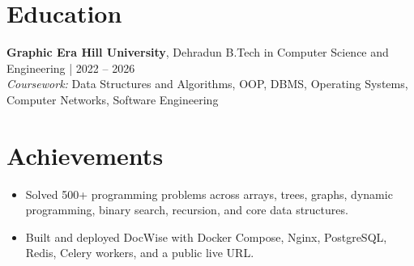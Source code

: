 \documentclass[a4paper,11pt]{article}
\begin{document}
\section{Education}
{\small
\textbf{Graphic Era Hill University}, Dehradun \hfill \textcolor{subtext}{B.Tech in Computer Science and Engineering | 2022 -- 2026}\\
\textit{Coursework:} Data Structures and Algorithms, OOP, DBMS, Operating Systems, Computer Networks, Software Engineering
}

\section{Achievements}
{\small
\begin{itemize}
  \item Solved 500+ programming problems across arrays, trees, graphs, dynamic programming, binary search, recursion, and core data structures.
  \item Built and deployed DocWise with Docker Compose, Nginx, PostgreSQL, Redis, Celery workers, and a public live URL.
\end{itemize}
}
\end{document}
